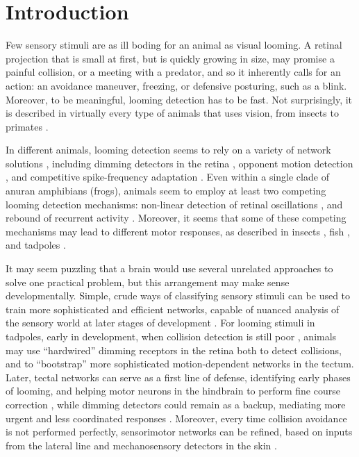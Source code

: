 \documentclass{article}
\begin{document}
\section*{Introduction}

Few sensory stimuli are as ill boding for an animal as visual looming. A retinal projection that is small at first, but is quickly growing in size, may promise a painful collision, or a meeting with a predator, and so it inherently calls for an action: an avoidance maneuver, freezing, or defensive posturing, such as a blink. Moreover, to be meaningful, looming detection has to be fast. Not surprisingly, it is described in virtually every type of animals that uses vision, from insects to primates \citep{Pereira2016}.

In different animals, looming detection seems to rely on a variety of network solutions \citep{frost2004review}, including dimming detectors in the retina \citep{ishikane2005,munch2009}, opponent motion detection \citep{klapoetke2017looming}, and competitive spike-frequency adaptation \citep{peron2009adaptation,fotowat2011multiplexing}. Even within a single clade of anuran amphibians (frogs), animals seem to employ at least two competing looming detection mechanisms: non-linear detection of retinal oscillations \citep{baranauskas2012}, and rebound of recurrent activity \citep{khakhalin2014,jang2016}. Moreover, it seems that some of these competing mechanisms may lead to different motor responses, as described in insects \citep{card2008tradeoffs,chan2013avoidance}, fish \citep{burgess2007twoescapes,portugues2009behaviors,budick2000repertoire,temizer2015pathway,bhattacharyya2017assessment}, and tadpoles \citep{khakhalin2014}.

It may seem puzzling that a brain would use several unrelated approaches to solve one practical problem, but this arrangement may make sense developmentally. Simple, crude ways of classifying sensory stimuli can be used to train more sophisticated and efficient networks, capable of nuanced analysis of the sensory world at later stages of development \citep{marblestone2016deeplearning}. For looming stimuli in tadpoles, early in development, when collision detection is still poor \citep{dong2009}, animals may use “hardwired” dimming receptors in the retina \citep{baranauskas2012} both to detect collisions, and to “bootstrap” more sophisticated motion-dependent networks in the tectum. Later, tectal networks can serve as a first line of defense, identifying early phases of looming, and helping motor neurons in the hindbrain to perform fine course correction \citep{khakhalin2014,bhattacharyya2017assessment}, while dimming detectors could remain as a backup, mediating more urgent and less coordinated responses \citep{khakhalin2014}. Moreover, every time collision avoidance is not performed perfectly, sensorimotor networks can be refined, based on inputs from the lateral line and mechanosensory detectors in the skin \citep{felch2016, helmbrecht2018topography}.
\end{document}

